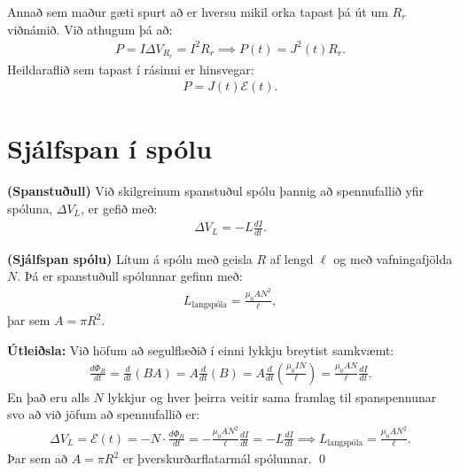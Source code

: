 Annað sem maður gæti spurt að er hversu mikil orka tapast þá út um $R_r$ viðnámið. Við athugum þá að:
\begin{align*}
    P = I \Delta V_{R_r} = I^2 R_r \implies P(t) = J^2(t) R_r.
\end{align*}
Heildaraflið sem tapast í rásinni er hinsvegar:
\begin{align*}
    P = J(t)\mathcal{E}(t).
\end{align*}

\newpage

\section{Sjálfspan í spólu}

\begin{tcolorbox}
\begin{theorem}
\textbf{(Spanstuðull)} Við skilgreinum spanstuðul spólu þannig að spennufallið yfir spóluna, $\Delta V_L$, er gefið með:
\begin{align*}
    \Delta V_L = - L \frac{dI}{dt}.
\end{align*}
\end{theorem}
\end{tcolorbox}

\begin{tcolorbox}
\begin{theorem}
\textbf{(Sjálfspan spólu)} Lítum á spólu með geisla $R$ af lengd $\ell$ og með vafningafjölda $N$. Þá er spanstuðull spólunnar gefinn með:
\begin{align*}
    L_{\text{langspóla}} = \frac{\mu_0 A N^2}{\ell},
\end{align*}
þar sem $A = \pi R^2$.
\end{theorem}
\end{tcolorbox}

\textbf{Útleiðsla:} Við höfum að segulflæðið í einni lykkju breytist samkvæmt:
\begin{align*}
    \frac{d\Phi_B}{dt} = \frac{d}{dt}\left( BA \right) = A \frac{d}{dt}(B) = A \frac{d}{dt}\left( \frac{\mu_0 I N}{\ell} \right) = \frac{\mu_0 A N}{\ell} \frac{dI}{dt}.
\end{align*}
En það eru alls $N$ lykkjur og hver þeirra veitir sama framlag til spanspennunar svo að við jöfum að spennufallið er:
\begin{align*}
    \Delta V_L = \mathcal{E}(t) = -N \cdot \frac{d \Phi_B}{dt} = - \frac{\mu_0 A N^2}{\ell} \frac{dI}{dt} = -L \frac{dI}{dt} \implies L_{\text{langspóla}} = \frac{\mu_0 A N^2}{\ell}.
\end{align*}
Þar sem að $A = \pi R^2$ er þverskurðarflatarmál spólunnar. \qed





